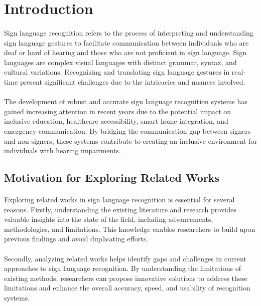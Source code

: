 \section{Introduction}
\paragraph{}
Sign language recognition refers to the process of interpreting and understanding sign language gestures to facilitate communication between individuals who are deaf or hard of hearing and those who are not proficient in sign language. Sign languages are complex visual languages with distinct grammar, syntax, and cultural variations. Recognizing and translating sign language gestures in real-time present significant challenges due to the intricacies and nuances involved.
\paragraph{}
The development of robust and accurate sign language recognition systems has gained increasing attention in recent years due to the potential impact on inclusive education, healthcare accessibility, smart home integration, and emergency communication. By bridging the communication gap between signers and non-signers, these systems contribute to creating an inclusive environment for individuals with hearing impairments.
\subsection{Motivation for Exploring Related Works}
\paragraph{}
Exploring related works in sign language recognition is essential for several reasons. Firstly, understanding the existing literature and research provides valuable insights into the state of the field, including advancements, methodologies, and limitations. This knowledge enables researchers to build upon previous findings and avoid duplicating efforts.
\paragraph{}
Secondly, analyzing related works helps identify gaps and challenges in current approaches to sign language recognition. By understanding the limitations of existing methods, researchers can propose innovative solutions to address these limitations and enhance the overall accuracy, speed, and usability of recognition systems.
